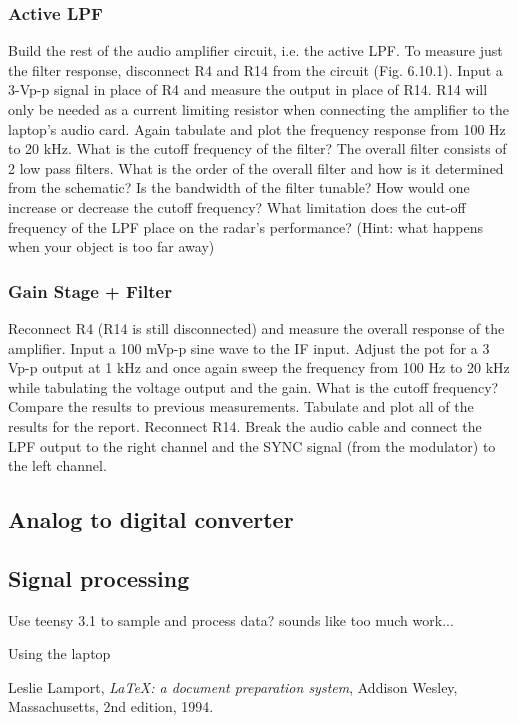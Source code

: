 \documentclass[letterpaper, 11pt]{article}
\begin{document}
\subsubsection{Active LPF}
Build the rest of the audio amplifier circuit, i.e. the active LPF. To measure just the filter response, disconnect R4 and R14 from the circuit (Fig. 6.10.1). Input a 3-Vp-p signal in place of R4 and measure the output in place of R14. R14 will only be needed as a current limiting resistor when connecting the amplifier to the laptop’s audio card. Again tabulate and plot the frequency response from 100 Hz to 20 kHz. What is the cutoff frequency of the filter?
The overall filter consists of 2 low pass filters. What is the order of the overall filter and how is it determined from the schematic? Is the bandwidth of the filter tunable? How would one increase or decrease the cutoff frequency?
What limitation does the cut-off frequency of the LPF place on the radar’s performance?  (Hint: what happens when your object is too far away)

\subsubsection{Gain Stage + Filter}
Reconnect R4 (R14 is still disconnected) and measure the overall response of the amplifier. Input a 100 mVp-p sine wave to the IF input. Adjust the pot for a 3 Vp-p output at 1 kHz and once again sweep the frequency from 100 Hz to 20 kHz while tabulating the voltage output and the gain. What is the cutoff frequency? Compare the results to previous measurements. Tabulate and plot all of the results for the report.
Reconnect R14. Break the audio cable and connect the LPF output to the right channel and the SYNC signal (from the modulator) to the left channel. 


\subsection{Analog to digital converter}

\subsection{Signal processing}

Use teensy 3.1 to sample and process data? sounds like too much work...

Using the laptop



\begin{thebibliography}{9}

  Leslie Lamport,
  \emph{\LaTeX: a document preparation system},
  Addison Wesley, Massachusetts,
  2nd edition,
  1994.

\end{thebibliography}
\end{document}
